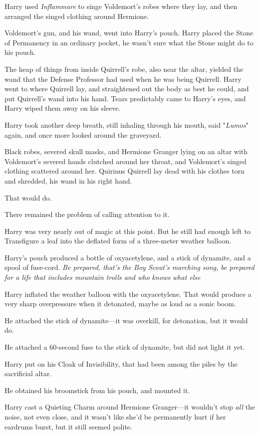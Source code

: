Harry used \emph{Inflammare} to singe Voldemort's robes where they lay, and
then arranged the singed clothing around Hermione.

Voldemort's gun, and his wand, went into Harry's pouch. Harry placed the Stone
of Permanency in an ordinary pocket, he wasn't sure what the Stone might do to
his pouch.

The heap of things from inside Quirrell's robe, also near the altar, yielded
the wand that the Defense Professor had used when he was being Quirrell. Harry
went to where Quirrell lay, and straightened out the body as best he could, and
put Quirrell's wand into his hand. Tears predictably came to Harry's eyes, and
Harry wiped them away on his sleeve.

Harry took another deep breath, still inhaling through his mouth, said
"\emph{Lumos}" again, and once more looked around the graveyard.

Black robes, severed skull masks, and Hermione Granger lying on an altar with
Voldemort's severed hands clutched around her throat, and Voldemort's singed
clothing scattered around her. Quirinus Quirrell lay dead with his clothes torn
and shredded, his wand in his right hand.

That would do.

There remained the problem of calling attention to it.

Harry was very nearly out of magic at this point. But he still had enough left
to Transfigure a leaf into the deflated form of a three-meter weather balloon.

Harry's pouch produced a bottle of oxyacetylene, and a stick of dynamite, and a
spool of fuse-cord. \emph{Be prepared, that's the Boy Scout's marching song, be
prepared for a life that includes mountain trolls and who knows what
else{\el}}

Harry inflated the weather balloon with the oxyacetylene. That would produce a
very sharp overpressure when it detonated, maybe as loud as a sonic boom.

He attached the stick of dynamite---it was overkill, for detonation, but it
would do.

He attached a 60-second fuse to the stick of dynamite, but did not light it yet.

Harry put on his Cloak of Invisibility, that had been among the piles by the
sacrificial altar.

He obtained his broomstick from his pouch, and mounted it.

Harry cast a Quieting Charm around Hermione Granger---it wouldn't stop
\emph{all} the noise, not even close, and it wasn't like she'd be permanently
hurt if her eardrums burst, but it still seemed polite.

